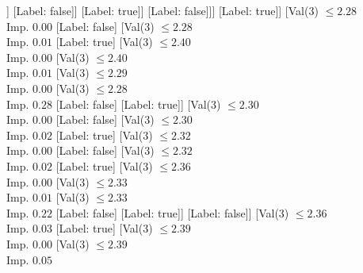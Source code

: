 \documentclass[margin=10pt]{standalone}
\begin{document}
\begin{forest}
									[Val($3$) $ \leq 2.23$ \\ Imp. $0.05$
										[Val($3$) $ \leq 2.21$ \\ Imp. $0.01$
											[Label: false]
											[Val($3$) $ \leq 2.22$ \\ Imp. $0.04$
												[Val($3$) $ \leq 2.22$ \\ Imp. $0.11$
													[Val($3$) $ \leq 2.21$ \\ Imp. $0.08$
														[Val($3$) $ \leq 2.21$ \\ Imp. $0.18$
															[Label: false]
															[Label: true]]
														[Label: false]]
													[Label: true]]
												[Label: false]]]
										[Label: true]]
									[Val($3$) $ \leq 2.28$ \\ Imp. $0.00$
										[Label: false]
										[Val($3$) $ \leq 2.28$ \\ Imp. $0.01$
											[Label: true]
											[Val($3$) $ \leq 2.40$ \\ Imp. $0.00$
												[Val($3$) $ \leq 2.40$ \\ Imp. $0.01$
													[Val($3$) $ \leq 2.29$ \\ Imp. $0.00$
														[Val($3$) $ \leq 2.28$ \\ Imp. $0.28$
															[Label: false]
															[Label: true]]
														[Val($3$) $ \leq 2.30$ \\ Imp. $0.00$
															[Label: false]
															[Val($3$) $ \leq 2.30$ \\ Imp. $0.02$
																[Label: true]
																[Val($3$) $ \leq 2.32$ \\ Imp. $0.00$
																	[Label: false]
																	[Val($3$) $ \leq 2.32$ \\ Imp. $0.02$
																		[Label: true]
																		[Val($3$) $ \leq 2.36$ \\ Imp. $0.00$
																			[Val($3$) $ \leq 2.33$ \\ Imp. $0.01$
																				[Val($3$) $ \leq 2.33$ \\ Imp. $0.22$
																					[Label: false]
																					[Label: true]]
																				[Label: false]]
																			[Val($3$) $ \leq 2.36$ \\ Imp. $0.03$
																				[Label: true]
																				[Val($3$) $ \leq 2.39$ \\ Imp. $0.00$
																					[Val($3$) $ \leq 2.39$ \\ Imp. $0.05$

\end{forest}
\end{document}
